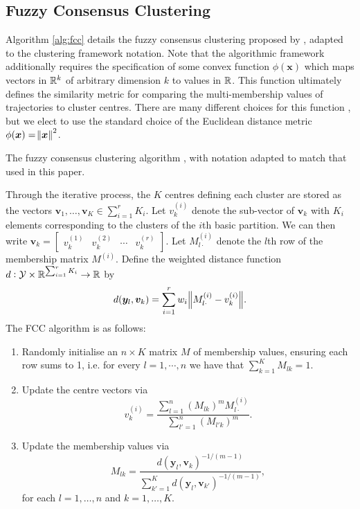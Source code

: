 \documentclass[a4paper, fontsize=12pt]{article}
\begin{document}
\begin{appendices}
\vspace{5mm}
\subsection{Fuzzy Consensus Clustering}\label{app:fcc}
Algorithm \ref{alg:fcc} details the fuzzy consensus clustering proposed by \cite{wu_2017_fcc}, adapted to the clustering framework notation. Note that the algorithmic framework additionally requires the specification of some convex function \(\phi(\bm{x})\) which maps vectors in \(\mathbb{R}^k\) of arbitrary dimension \(k\) to values in \(\mathbb{R}\). This function ultimately defines the similarity metric for comparing the multi-membership values of trajectories to cluster centres. There are many different choices for this function \citep{wu_2017_fcc}, but we elect to use the standard choice of the Euclidean distance metric \(\phi(\bm{x}) = \norm{\bm{x}}^2\).
\begin{algorithm}[H]
\caption{The fuzzy consensus clustering algorithm \cite{wu_2017_fcc}, with notation adapted to match that used in this paper.}

Through the iterative process, the \(K\) centres defining each cluster are stored as the vectors \(\bm{v}_1,\hdots,\bm{v}_K \in\sum_{i=1}^{r}{K_i}\). Let \(v_k^{(i)}\) denote the sub-vector of \(\bm{v}_k\) with \(K_i\) elements corresponding to the clusters of the \(i\)th basic partition. We can then write \(\bm{v}_k = \begin{bmatrix}v_k^{(1)} & v_k^{(2)} & \cdots & v_k^{(r)}\end{bmatrix}\). Let \(M_{l\cdot}^{(i)}\) denote the \(l\)th row of the membership matrix \(M^{(i)}\).  Define the weighted distance function \(d: \mathcal{Y}\times \mathbb{R}^{\sum_{i=1}^{r}{K_i}} \to \mathbb{R}\) by
\[
d(\bm{y}_l, \bm{v}_k) = \sum_{i=1}^{r}{w_i\norm{M_{l\cdot}^{(i)} - v_k^{(i)}}}.
\]
The FCC algorithm is as follows:
\begin{enumerate}
	\item Randomly initialise an \(n\times K\) matrix \(M\) of membership values, ensuring each row sums to 1, i.e. for every \(l = 1,\cdots, n\) we have that \(\sum_{k=1}^{K}{M_{lk}} = 1\).
	\item Update the centre vectors via
	\[
	v_k^{(i)} = \frac{\sum_{l=1}^{n}{\left(M_{lk}\right)^m}M_{l\cdot}^{(i)}}{\sum_{l'=1}^{n}{\left(M_{l'k}\right)^m}}.
	\]
	
	\item Update the membership values via
	\[
	M_{lk} = \frac{d\left(\bm{y}_l, \bm{v}_k\right)^{-1/(m-1)}}{\sum_{k' = 1}^K{d\left(\bm{y}_l, \bm{v}_{k'}\right)^{-1/(m-1)}}},
	\]
	for each \(l = 1,\hdots,n\) and \(k = 1,\hdots,K\).
	

\end{enumerate}
\end{algorithm}
\end{appendices}
\end{document}
